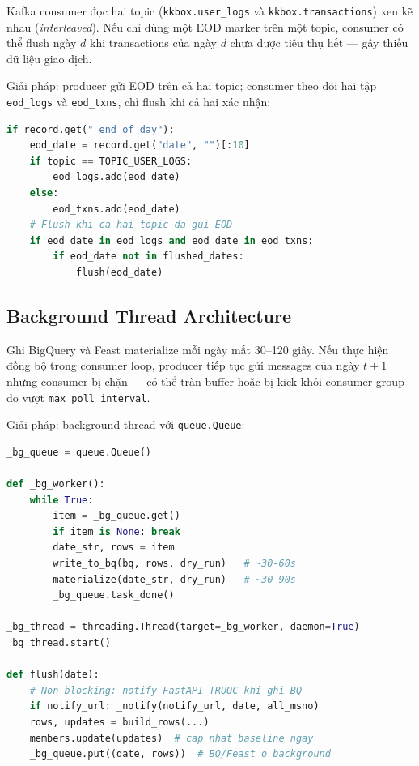 \documentclass[conference]{IEEEtran}
\begin{document}
Kafka consumer đọc hai topic (\texttt{kkbox.user\_logs} và
\texttt{kkbox.transactions}) xen kẽ nhau (\emph{interleaved}). Nếu chỉ dùng
một EOD marker trên một topic, consumer có thể flush ngày $d$ khi transactions
của ngày $d$ chưa được tiêu thụ hết — gây thiếu dữ liệu giao dịch.

Giải pháp: producer gửi EOD trên cả hai topic; consumer theo dõi hai tập
\texttt{eod\_logs} và \texttt{eod\_txns}, chỉ flush khi cả hai xác nhận:

\begin{lstlisting}[language=Python, caption={Dual EOD tracking}]
if record.get("_end_of_day"):
    eod_date = record.get("date", "")[:10]
    if topic == TOPIC_USER_LOGS:
        eod_logs.add(eod_date)
    else:
        eod_txns.add(eod_date)
    # Flush khi ca hai topic da gui EOD
    if eod_date in eod_logs and eod_date in eod_txns:
        if eod_date not in flushed_dates:
            flush(eod_date)
\end{lstlisting}

\subsection{Background Thread Architecture}

Ghi BigQuery và Feast materialize mỗi ngày mất 30–120 giây. Nếu thực hiện
đồng bộ trong consumer loop, producer tiếp tục gửi messages của ngày $t+1$
nhưng consumer bị chặn — có thể tràn buffer hoặc bị kick khỏi consumer group
do vượt \texttt{max\_poll\_interval}.

Giải pháp: background thread với \texttt{queue.Queue}:

\begin{lstlisting}[language=Python, caption={Background thread cho I/O chậm}]
_bg_queue = queue.Queue()

def _bg_worker():
    while True:
        item = _bg_queue.get()
        if item is None: break
        date_str, rows = item
        write_to_bq(bq, rows, dry_run)   # ~30-60s
        materialize(date_str, dry_run)   # ~30-90s
        _bg_queue.task_done()

_bg_thread = threading.Thread(target=_bg_worker, daemon=True)
_bg_thread.start()

def flush(date):
    # Non-blocking: notify FastAPI TRUOC khi ghi BQ
    if notify_url: _notify(notify_url, date, all_msno)
    rows, updates = build_rows(...)
    members.update(updates)  # cap nhat baseline ngay
    _bg_queue.put((date, rows))  # BQ/Feast o background
\end{lstlisting}
\end{document}
